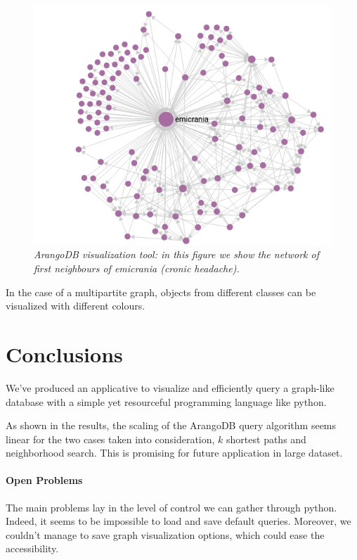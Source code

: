 \documentclass[11pt,twocolumn]{article}
\begin{document}
\begin{figure}[ht!]
   \includegraphics[width=\linewidth]{images/neigh_emicrania.png}
   \caption{\small{\textit{ArangoDB visualization tool: in this figure we show the network of first neighbours of \textit{emicrania} (cronic headache).}}}
   \label{fig:4}
\end{figure}

In the case of a multipartite graph, objects from different classes can be visualized with different colours.

\section{Conclusions}
\balance
We've produced an applicative to visualize and efficiently query a graph-like database with a simple yet resourceful programming language like python.

As shown in the results, the scaling of the ArangoDB query algorithm seems linear for the two cases taken into consideration, $k$ shortest paths and neighborhood search. This is promising for future application in large dataset.

\paragraph{Open Problems}

The main problems lay in the level of control we can gather through python. Indeed, it seems to be impossible to load and save default queries.
Moreover, we couldn't manage to save graph visualization options, which could ease the accessibility.
\end{document}
